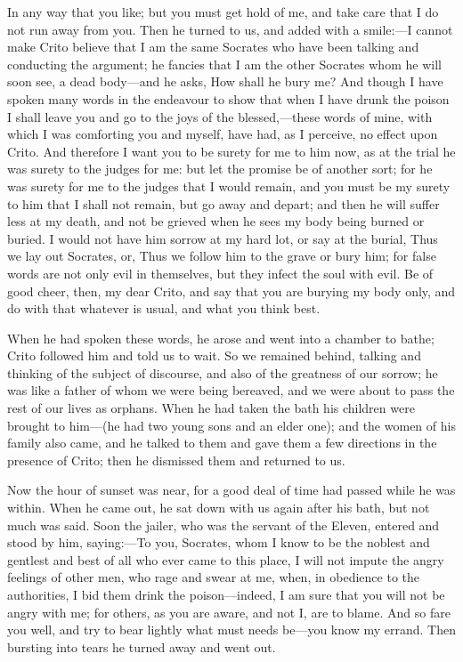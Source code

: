 In any way that you like; but you must get hold of me, and take care that
I do not run away from you. Then he turned to us, and added with a smile:—I
cannot make Crito believe that I am the same Socrates who have been
talking and conducting the argument; he fancies that I am the other
Socrates whom he will soon see, a dead body—and he asks, How shall
he bury me? And though I have spoken many words in the endeavour to show
that when I have drunk the poison I shall leave you and go to the joys of
the blessed,—these words of mine, with which I was comforting you
and myself, have had, as I perceive, no effect upon Crito. And therefore I
want you to be surety for me to him now, as at the trial he was surety to
the judges for me: but let the promise be of another sort; for he was
surety for me to the judges that I would remain, and you must be my surety
to him that I shall not remain, but go away and depart; and then he will
suffer less at my death, and not be grieved when he sees my body being
burned or buried. I would not have him sorrow at my hard lot, or say at
the burial, Thus we lay out Socrates, or, Thus we follow him to the grave
or bury him; for false words are not only evil in themselves, but they
infect the soul with evil. Be of good cheer, then, my dear Crito, and say
that you are burying my body only, and do with that whatever is usual, and
what you think best.

When he had spoken these words, he arose and went into a chamber to bathe;
Crito followed him and told us to wait. So we remained behind, talking and
thinking of the subject of discourse, and also of the greatness of our
sorrow; he was like a father of whom we were being bereaved, and we were
about to pass the rest of our lives as orphans. When he had taken the bath
his children were brought to him—(he had two young sons and an elder
one); and the women of his family also came, and he talked to them and
gave them a few directions in the presence of Crito; then he dismissed
them and returned to us.

Now the hour of sunset was near, for a good deal of time had passed while
he was within. When he came out, he sat down with us again after his bath,
but not much was said. Soon the jailer, who was the servant of the Eleven,
entered and stood by him, saying:—To you, Socrates, whom I know to
be the noblest and gentlest and best of all who ever came to this place, I
will not impute the angry feelings of other men, who rage and swear at me,
when, in obedience to the authorities, I bid them drink the poison—indeed,
I am sure that you will not be angry with me; for others, as you are
aware, and not I, are to blame. And so fare you well, and try to bear
lightly what must needs be—you know my errand. Then bursting into
tears he turned away and went out.

